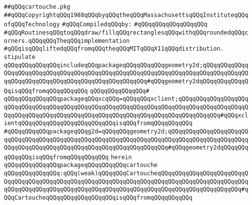 \label{src/lib/x-kit/draw/cartouche.pkg}
\verb|##qQQqcartouche.pkg|\newline
\verb|##qQQqCopyrightqQQq1988qQQqbyqQQqtheqQQqMassachusettsqQQqInstituteqQQqofqQQqTechnology|\newline
\newline
\verb|#qQQqCompiledqQQqby:|\newline
\verb|#qQQqqQQqqQQqqQQqqQQq|\newline
\newline
\verb|#qQQqRoutinesqQQqtoqQQqdraw/fillqQQqrectanglesqQQqwithqQQqroundedqQQqcorners.qQQqqQQqTheqQQqimplementation|\newline
\verb|#qQQqisqQQqliftedqQQqfromqQQqtheqQQqMITqQQqX11qQQqdistribution.|\newline
\newline
\verb|stipulate|\newline
\verb|qQQqqQQqqQQqqQQqincludeqQQqpackageqQQqqQQqqQQqgeometry2d;qQQqqQQqqQQqqQQqqQQqqQQqqQQqqQQqqQQqqQQqqQQqqQQqqQQqqQQqqQQqqQQqqQQqqQQqqQQqqQQqqQQqqQQqqQQqqQQqqQQqqQQqqQQqqQQqqQQqqQQqqQQq#qQQqgeometry2dqQQqqQQqqQQqqQQqisqQQqfromqQQqqQQqqQQq|\newline
\verb|qQQqqQQqqQQqqQQq#|\newline
\verb|qQQqqQQqqQQqqQQqpackageqQQqxcqQQq=qQQqqQQqxclient;qQQqqQQqqQQqqQQqqQQqqQQqqQQqqQQqqQQqqQQqqQQqqQQqqQQqqQQqqQQqqQQqqQQqqQQqqQQqqQQqqQQqqQQqqQQqqQQqqQQqqQQqqQQqqQQqqQQqqQQqqQQqqQQqqQQqqQQqqQQqqQQqqQQqqQQq#qQQqxclientqQQqqQQqqQQqqQQqqQQqqQQqqQQqisqQQqfromqQQqqQQqqQQq|\newline
\verb|#qQQqqQQqqQQqpackageqQQqg2d=qQQqqQQqgeometry2d;qQQqqQQqqQQqqQQqqQQqqQQqqQQqqQQqqQQqqQQqqQQqqQQqqQQqqQQqqQQqqQQqqQQqqQQqqQQqqQQqqQQqqQQqqQQqqQQqqQQqqQQqqQQqqQQqqQQqqQQqqQQqqQQqqQQqqQQqqQQq#qQQqgeometry2dqQQqqQQqqQQqqQQqisqQQqfromqQQqqQQqqQQq|\newline
\verb|herein|\newline
\verb|qQQqqQQqqQQqqQQqpackageqQQqqQQqqQQqcartouche|\newline
\verb|qQQqqQQqqQQqqQQq:qQQq(weak)qQQqqQQqCartoucheqQQqqQQqqQQqqQQqqQQqqQQqqQQqqQQqqQQqqQQqqQQqqQQqqQQqqQQqqQQqqQQqqQQqqQQqqQQqqQQqqQQqqQQqqQQqqQQqqQQqqQQqqQQqqQQqqQQqqQQqqQQqqQQqqQQqqQQqqQQqqQQqqQQqqQQqqQQqqQQqqQQq#qQQqCartoucheqQQqqQQqqQQqqQQqqQQqisqQQqfromqQQqqQQqqQQq|\newline
